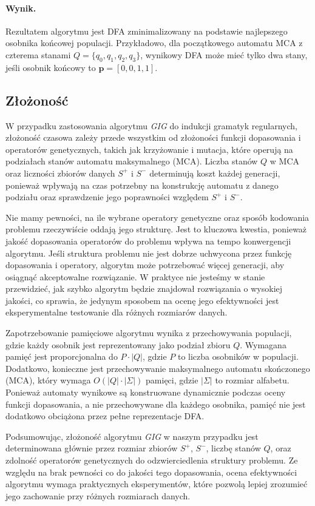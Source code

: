\paragraph*{Wynik.}  
Rezultatem algorytmu jest DFA zminimalizowany na podstawie najlepszego osobnika końcowej populacji. Przykładowo, dla początkowego automatu MCA z czterema stanami \( Q = \{q_0, q_1, q_2, q_3\} \), wynikowy DFA może mieć tylko dwa stany, jeśli osobnik końcowy to \( \mathbf{p} = [0, 0, 1, 1] \).

\subsection{Złożoność}

W przypadku zastosowania algorytmu \textit{GIG} do indukcji gramatyk regularnych, złożoność czasowa zależy przede wszystkim od złożoności funkcji dopasowania i operatorów genetycznych, takich jak krzyżowanie i mutacja, które operują na podziałach stanów automatu maksymalnego (MCA). Liczba stanów \( Q \) w MCA oraz liczności zbiorów danych \( S^+ \) i \( S^- \) determinują koszt każdej generacji, ponieważ wpływają na czas potrzebny na konstrukcję automatu z danego podziału oraz sprawdzenie jego poprawności względem \( S^+ \) i \( S^- \).

Nie mamy pewności, na ile wybrane operatory genetyczne oraz sposób kodowania problemu rzeczywiście oddają jego strukturę. Jest to kluczowa kwestia, ponieważ jakość dopasowania operatorów do problemu wpływa na tempo konwergencji algorytmu. Jeśli struktura problemu nie jest dobrze uchwycona przez funkcję dopasowania i operatory, algorytm może potrzebować więcej generacji, aby osiągnąć akceptowalne rozwiązanie. W praktyce nie jesteśmy w stanie przewidzieć, jak szybko algorytm będzie znajdował rozwiązania o wysokiej jakości, co sprawia, że jedynym sposobem na ocenę jego efektywności jest eksperymentalne testowanie dla różnych rozmiarów danych.

Zapotrzebowanie pamięciowe algorytmu wynika z przechowywania populacji, gdzie każdy osobnik jest reprezentowany jako podział zbioru \( Q \). Wymagana pamięć jest proporcjonalna do \( P \cdot |Q| \), gdzie \( P \) to liczba osobników w populacji. Dodatkowo, konieczne jest przechowywanie maksymalnego automatu skończonego (MCA), który wymaga \( O(|Q| \cdot |\Sigma|) \) pamięci, gdzie \( |\Sigma| \) to rozmiar alfabetu. Ponieważ automaty wynikowe są konstruowane dynamicznie podczas oceny funkcji dopasowania, a nie przechowywane dla każdego osobnika, pamięć nie jest dodatkowo obciążona przez pełne reprezentacje DFA.

Podsumowując, złożoność algorytmu \textit{GIG} w naszym przypadku jest determinowana głównie przez rozmiar zbiorów \( S^+ \), \( S^- \), liczbę stanów \( Q \), oraz zdolność operatorów genetycznych do odzwierciedlenia struktury problemu. Ze względu na brak pewności co do jakości tego dopasowania, ocena efektywności algorytmu wymaga praktycznych eksperymentów, które pozwolą lepiej zrozumieć jego zachowanie przy różnych rozmiarach danych.
